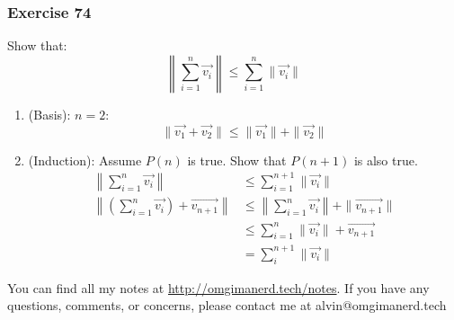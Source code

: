 \documentclass[letterpaper, 12pt]{math}
\begin{document}
\subsubsection*{Exercise 74}
Show that:
\[ \left\|\sum_{i=1}^{n}\vec{v_i}\right\| \le \sum_{i=1}^{n}\|\vec{v_i}\| \]
\begin{enumerate}
  \item (Basis): \( n = 2 \):
    \[ \|\vec{v_1}+\vec{v_2}\| \le \|\vec{v_1}\|+\|\vec{v_2}\| \]
  \item (Induction): Assume \( P(n) \) is true. Show that \( P(n+1) \) is also
    true.
    \begin{align*}
      \left\|\sum_{i=1}^{n}\vec{v_i}\right\| &\le
        \sum_{i=1}^{n+1}\|\vec{v_i}\| \\
      \left\|(\sum_{i=1}^{n}\vec{v_i})+\vec{v_{n+1}}\right\|
      &\le \left\|\sum_{i=1}^{n}\vec{v_i}\right\|+\|\vec{v_{n+1}}\| \\
      &\le \sum_{i=1}^{n}\|\vec{v_{i}}\|+\vec{v_{n+1}} \\
      &= \sum_{i}^{n+1}\|\vec{v_i}\|
    \end{align*}
\end{enumerate}

\begin{center}
  You can find all my notes at \url{http://omgimanerd.tech/notes}. If you have
  any questions, comments, or concerns, please contact me at
  alvin@omgimanerd.tech
\end{center}
\end{document}
